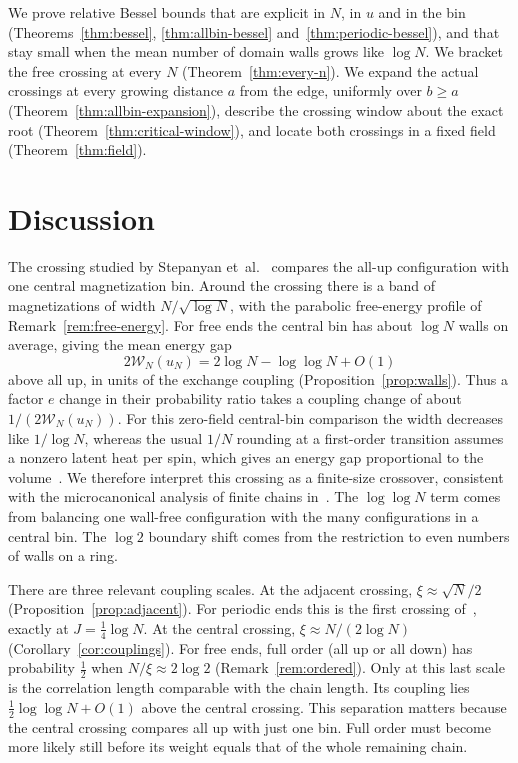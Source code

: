 \documentclass[11pt]{article}
\theoremstyle{definition}
\theoremstyle{remark}
\begin{document}
We prove relative
Bessel bounds that are explicit in $N$, in $u$ and in the bin
(Theorems~\ref{thm:bessel}, \ref{thm:allbin-bessel}
and~\ref{thm:periodic-bessel}), and that stay small when the mean number of
domain walls grows like $\log N$. We bracket the free crossing at every $N$
(Theorem~\ref{thm:every-n}). We expand the actual crossings at every growing distance $a$ from the edge,
uniformly over $b\ge a$ (Theorem~\ref{thm:allbin-expansion}), describe
the crossing window about the exact root (Theorem~\ref{thm:critical-window}),
and locate both crossings in a fixed field (Theorem~\ref{thm:field}).





\FloatBarrier

\section{Discussion}\label{sec:discussion}

The crossing studied by Stepanyan et~al.\@~\cite{stepanyan2024} compares
the all-up configuration with one central magnetization bin. Around
the crossing there is a band of magnetizations of width
$N/\sqrt{\log N}$, with the parabolic free-energy profile of
Remark~\ref{rem:free-energy}. For free ends the central bin has about
$\log N$ walls on average, giving the mean energy gap
\[
2\mathcal W_N(u_N)=2\log N-\log\log N+O(1)
\]
above all up, in units of the exchange coupling
(Proposition~\ref{prop:walls}). Thus a factor $e$ change in their
probability ratio takes a coupling change of about
$1/(2\mathcal W_N(u_N))$. For this zero-field central-bin comparison
the width decreases like $1/\log N$, whereas the usual $1/N$ rounding at
a first-order transition assumes a nonzero latent heat per spin, which
gives an energy gap proportional to the
volume~\cite{privman1983,borgs1990,lee1991}. We therefore interpret
this crossing as a finite-size crossover, consistent with the
microcanonical analysis of finite chains in~\cite{sitarachu2020}.
The $\log\log N$ term comes from balancing one wall-free configuration
with the many configurations in a central bin. The $\log2$ boundary
shift comes from the restriction to even numbers of walls on a ring.

There are three relevant coupling scales. At the adjacent crossing,
$\xi\approx\sqrt N/2$ (Proposition~\ref{prop:adjacent}). For periodic
ends this is the first crossing of~\cite{stepanyan2024}, exactly at
$J=\frac14\log N$. At the central crossing,
$\xi\approx N/(2\log N)$ (Corollary~\ref{cor:couplings}). For free
ends, full order (all up or all down) has probability $\frac12$ when
$N/\xi\approx2\log2$ (Remark~\ref{rem:ordered}). Only at this last
scale is the correlation length comparable with the chain length.
Its coupling lies $\frac12\log\log N+O(1)$ above the central crossing.
This separation matters because the central crossing compares all up
with just one bin. Full order must become more likely still before
its weight equals that of the whole remaining chain.
\end{document}
